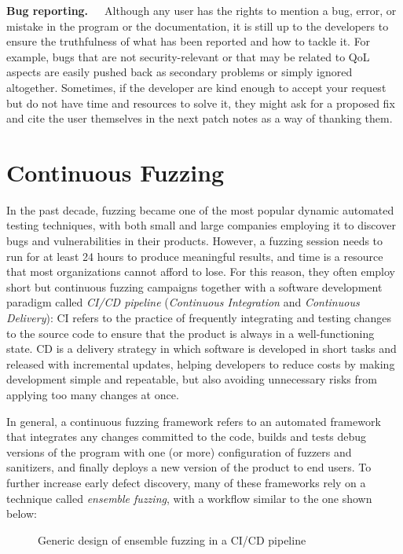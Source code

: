 \textbf{Bug reporting.}\ \ \ Although any user has the rights to mention a bug, error, or mistake in the program or the documentation, it is still up to the developers to ensure the truthfulness of what has been reported and how to tackle it. For example, bugs that are not security-relevant or that may be related to QoL aspects are easily pushed back as secondary problems or simply ignored altogether. Sometimes, if the developer are kind enough to accept your request but do not have time and resources to solve it, they might ask for a proposed fix and cite the user themselves in the next patch notes as a way of thanking them.



\newpage
\section{Continuous Fuzzing}
In the past decade, fuzzing became one of the most popular dynamic automated testing techniques, with both small and large companies employing it to discover bugs and vulnerabilities in their products. However, a fuzzing session needs to run for at least 24 hours \cite{evaluating_fuzz} to produce meaningful results, and time is a resource that most organizations cannot afford to lose. For this reason, they often employ short but continuous fuzzing campaigns together with a software development paradigm called \textit{CI/CD pipeline} (\textit{Continuous Integration} and \textit{Continuous Delivery}): CI refers to the practice of frequently integrating and testing changes to the source code to ensure that the product is always in a well-functioning state. CD is a delivery strategy in which software is developed in short tasks and released with incremental updates, helping developers to reduce costs by making development simple and repeatable, but also avoiding unnecessary risks from applying too many changes at once. 

In general, a continuous fuzzing framework refers to an automated framework that integrates any changes committed to the code, builds and tests debug versions of the program with one (or more) configuration of fuzzers and sanitizers, and finally deploys a new version of the product to end users. To further increase early defect discovery, many of these frameworks rely on a technique called \textit{ensemble fuzzing}, with a workflow similar to the one shown below:

\begin{figure}[h]
\caption{Generic design of ensemble fuzzing in a CI/CD pipeline \cite{continuous_fuzzing}}
\label{fig:continuous_fuzzing}
\end{figure}


